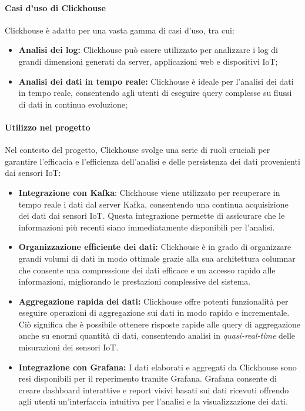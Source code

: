 \paragraph{Casi d'uso di Clickhouse}
Clickhouse è adatto per una vasta gamma di casi d'uso, tra cui:
\begin{itemize}
    \item \textbf{Analisi dei log:} Clickhouse può essere utilizzato per analizzare i log di grandi dimensioni generati da server, applicazioni web e dispositivi IoT;
    \item \textbf{Analisi dei dati in tempo reale:} Clickhouse è ideale per l'analisi dei dati in tempo reale, consentendo agli utenti di eseguire query complesse su flussi di dati in continua evoluzione;
\end{itemize}

\paragraph{Utilizzo nel progetto}
Nel contesto del progetto, Clickhouse svolge una serie di ruoli cruciali per garantire l'efficacia e l'efficienza dell'analisi e delle persistenza dei dati provenienti dai sensori IoT:

\begin{itemize}
  \item \textbf{Integrazione con Kafka}: Clickhouse viene utilizzato per recuperare in tempo reale i dati dal server Kafka, consentendo una continua acquisizione dei dati dai sensori IoT. Questa integrazione permette di assicurare che le informazioni più recenti siano immediatamente disponibili per l'analisi.
  
  \item \textbf{Organizzazione efficiente dei dati:} Clickhouse è in grado di organizzare grandi volumi di dati in modo ottimale grazie alla sua architettura columnar che consente una compressione dei dati efficace e un accesso rapido alle informazioni, migliorando le prestazioni complessive del sistema.
  
  \item \textbf{Aggregazione rapida dei dati:} Clickhouse offre potenti funzionalità per eseguire operazioni di aggregazione sui dati in modo rapido e incrementale. Ciò significa che è possibile ottenere risposte rapide alle query di aggregazione anche su enormi quantità di dati, consentendo analisi in \textit{quasi-real-time} delle misurazioni dei sensori IoT.
  
  \item \textbf{Integrazione con Grafana:} I dati elaborati e aggregati da Clickhouse sono resi disponibili per il reperimento tramite Grafana. Grafana consente di creare dashboard interattive e report visivi basati sui dati ricevuti offrendo agli utenti un'interfaccia intuitiva per l'analisi e la visualizzazione dei dati.
\end{itemize}
